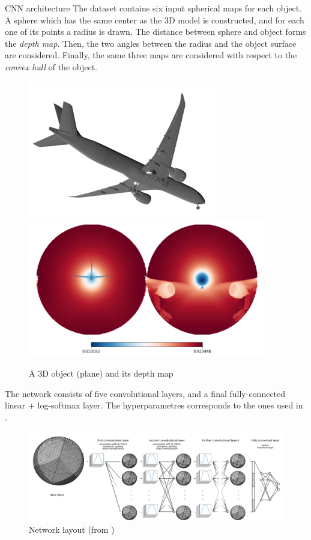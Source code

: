 \documentclass[final]{beamer}
\newlength{\colwidth}
\begin{document}
\begin{frame}[t]
\begin{columns}[t]
\begin{column}{\colwidth}
\begin{block}{CNN architecture}
    The dataset contains six input spherical maps for each object. A sphere which has the same center as the 3D model is constructed, and for each one of its points a radius is drawn. The distance between sphere and object forms the \emph{depth map}. Then, the two angles between the radius and the object surface are considered. Finally, the same three maps are considered with respect to the \emph{convex hull} of the object.
    \begin{figure}[h]
      \includegraphics[height=6cm]{airplane.png}
      \includegraphics[height=6cm]{airplane-map.png}
      \caption{A 3D object (plane) and its depth map}
    \end{figure}

    The network consists of five convolutional layers, and a final fully-connected linear + log-softmax layer.
    The hyperparametres corresponds to the ones used in \cite{deepsphere_iclr:2019}.

    \begin{figure}[h]
      \includegraphics[width=0.9\colwidth]{scheme.png}
      \caption{Network layout (from \cite{deepshpere_cosmo})}
    \end{figure}
  \end{block}


\end{column}
\end{columns}
\end{frame}
\end{document}
